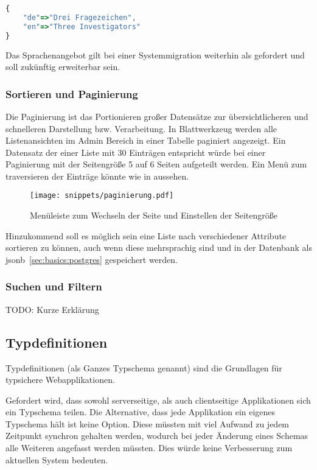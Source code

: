 \begin{lstlisting}[language=JavaScript,float=h!,caption={Speicherung der Projektnamen als jsonb}, label={sec:requirements:multilang}]
{
    "de"=>"Drei Fragezeichen",
    "en"=>"Three Investigators"
}
\end{lstlisting}

Das Sprachenangebot gilt bei einer Systemmigration weiterhin als gefordert und soll zukünftig erweiterbar sein.

\subsubsection{Sortieren und Paginierung}
Die Paginierung ist das Portionieren großer Datensätze zur übersichtlicheren und schnelleren Darstellung bzw. Verarbeitung.
In Blattwerkzeug werden alle Listenansichten im Admin Bereich in einer Tabelle paginiert angezeigt.
Ein Datensatz der einer Liste mit 30 Einträgen entspricht würde bei einer Paginierung mit der Seitengröße 5 auf 6 Seiten aufgeteilt werden.
Ein Menü zum traversieren der Einträge könnte wie in  aussehen.

\begin{figure}[h!]
    \centering
    \texttt{[image: snippets/paginierung.pdf]}
    \caption{Menüleiste zum Wechseln der Seite und Einstellen der Seitengröße}
    \label{req:view:pagination}
\end{figure}

Hinzukommend soll es möglich sein eine Liste nach verschiedener Attribute sortieren zu können, auch wenn diese mehrsprachig sind und
in der Datenbank als jsonb~\ref{sec:basics:postgres} gespeichert werden.

\subsubsection{Suchen und Filtern}
TODO: Kurze Erklärung

\subsection{Typdefinitionen}

Typdefinitionen (als Ganzes Typschema genannt) sind die Grundlagen für typsichere Webapplikationen.

Gefordert wird, dass sowohl serverseitige, als auch clientseitige Applikationen sich ein Typschema teilen. 
Die Alternative, dass jede Applikation ein eigenes Typschema hält ist keine Option. Diese müssten mit viel Aufwand zu jedem Zeitpunkt synchron gehalten werden, wodurch bei jeder Änderung eines Schemas alle Weiteren angefasst werden müssten. Dies würde keine Verbesserung zum aktuellen System bedeuten.

